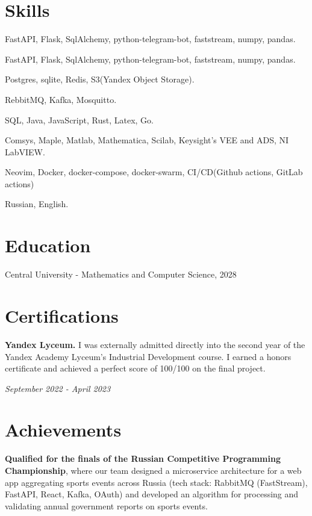 \documentclass[margin,line]{resume}
\begin{document}
\begin{resume}
  \section{\mysidestyle Skills}
  \begin{description}[leftmargin=0pt, itemindent=*]
    \item[Python:] FastAPI, Flask, SqlAlchemy, python-telegram-bot,
      faststream, numpy, pandas.
    \item[Go] FastAPI, Flask, SqlAlchemy, python-telegram-bot,
      faststream, numpy, pandas.
    \item[Databases] Postgres, sqlite, Redis, S3(Yandex Object Storage).
    \item[Message brokers:] RebbitMQ, Kafka, Mosquitto.
    \item[Other techonologies:] SQL, Java, JavaScript, Rust, Latex, Go.
    \item[Scientific softwares] Comsys, Maple, Matlab, Mathematica,
      Scilab, Keysight's VEE and ADS, NI LabVIEW.
    \item[Dev tools:] Neovim, Docker, docker-compose, docker-swarm,
      CI/CD(Github actions, GitLab actions)
    \item[Languages:] Russian, English.
  \end{description}

  \section{\mysidestyle Education}
  Central University - Mathematics and Computer Science, 2028

  \section{\mysidestyle Certifications}
  \textbf{Yandex Lyceum.} I was externally admitted directly into the
  second year of the Yandex Academy Lyceum's Industrial Development
  course. I earned a honors certificate and achieved a perfect score
  of 100/100 on the final project.
  \vspace{-6mm}

  \hfill \textsl{September 2022 - April 2023}

  \section{\mysidestyle Achievements}
  \textbf{Qualified for the finals of the Russian Competitive
  Programming Championship}, where our team designed a microservice
  architecture for a web app aggregating sports events across Russia
  (tech stack: RabbitMQ (FastStream), FastAPI, React, Kafka, OAuth)
  and developed an algorithm for processing and validating annual
  government reports on sports events.
  \vspace{-6mm}


\end{resume}
\end{document}
